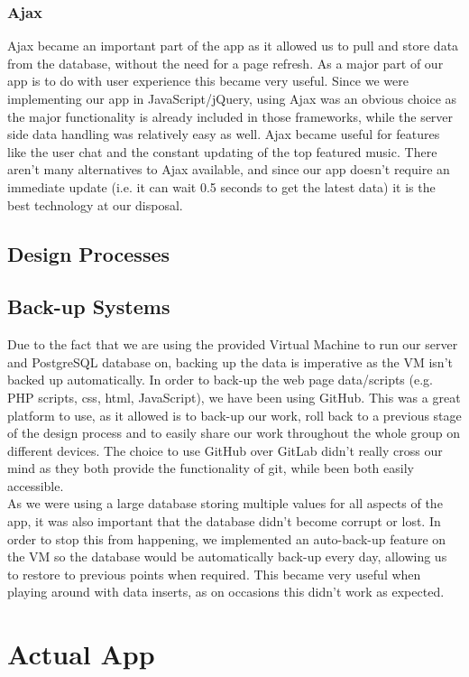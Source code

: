 \documentclass{article}
\begin{document}
\subsubsection{Ajax}
Ajax became an important part of the app as it allowed us to pull and store data from the database, without the need for a page refresh. As a major part of our app is to do with user experience this became very useful. Since we were implementing our app in JavaScript/jQuery, using Ajax was an obvious choice as the major functionality is already included in those frameworks, while the server side data handling was relatively easy as well. Ajax became useful for features like the user chat and the constant updating of the top featured music. There aren't many alternatives to Ajax available, and since our app doesn't require an immediate update (i.e. it can wait 0.5 seconds to get the latest data) it is the best technology at our disposal.
\subsection{Design Processes}
\subsection{Back-up Systems}
Due to the fact that we are using the provided Virtual Machine to run our server and PostgreSQL database on, backing up the data is imperative as the VM isn't backed up automatically. In order to back-up the web page data/scripts (e.g. PHP scripts, css, html, JavaScript), we have been using GitHub. This was a great platform to use, as it allowed is to back-up our work, roll back to a previous stage of the design process and to easily share our work throughout the whole group on different devices. The choice to use GitHub over GitLab didn't really cross our mind as they both provide the functionality of git, while been both easily accessible. \\
\newline
As we were using a large database storing multiple values for all aspects of the app, it was also important that the database didn't become corrupt or lost. In order to stop this from happening, we implemented an auto-back-up feature on the VM so the database would be automatically back-up every day, allowing us to restore to previous points when required. This became very useful when playing around with data inserts, as on occasions this didn't work as expected.

\section{Actual App}
\end{document}
